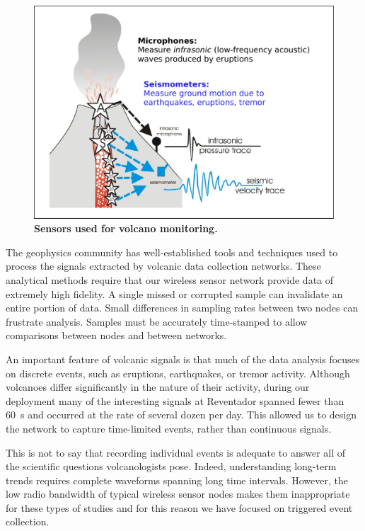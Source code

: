 \begin{figure}[t]
\begin{center}
\includegraphics[width=0.9\hsize]{./2-related/figs/NewCartoon.pdf}
\end{center}
\caption{\textbf{Sensors used for volcano monitoring.}}
\label{introduction-fig-cartoon}
\end{figure}

The geophysics community has well-established tools and techniques used to
process the signals extracted by volcanic data collection networks. These
analytical methods require that our wireless sensor network provide data of
extremely high fidelity. A single missed or corrupted sample can invalidate
an entire portion of data. Small differences in sampling rates between two
nodes can frustrate analysis. Samples must be accurately time-stamped to
allow comparisons between nodes and between networks.

An important feature of volcanic signals is that much of the data analysis
focuses on discrete events, such as eruptions, earthquakes, or tremor
activity. Although volcanoes differ significantly in the nature of their
activity, during our deployment many of the interesting signals at Reventador
spanned fewer than 60~s and occurred at the rate of several dozen per day.
This allowed us to design the network to capture time-limited events, rather
than continuous signals.

This is not to say that recording individual events is adequate to answer all
of the scientific questions volcanologists pose. Indeed, understanding
long-term trends requires complete waveforms spanning long time intervals.
However, the low radio bandwidth of typical wireless sensor nodes makes them
inappropriate for these types of studies and for this reason we have focused
on triggered event collection.

